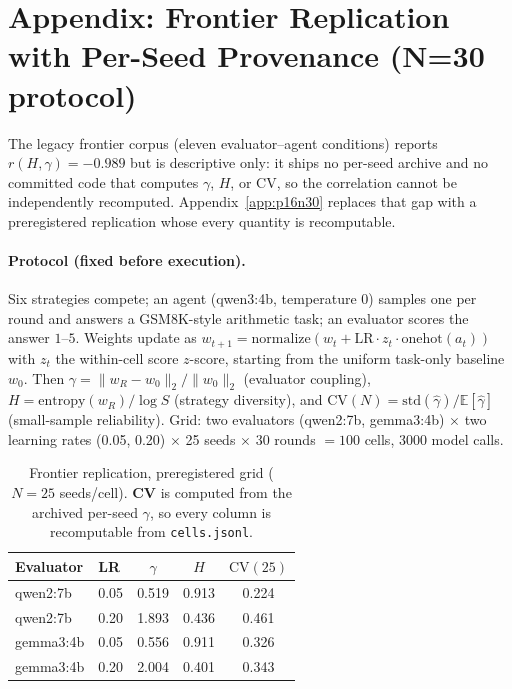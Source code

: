 \documentclass[11pt]{article}
\begin{document}

\section*{Appendix: Frontier Replication with Per-Seed Provenance (N=30 protocol)}
\label{app:p16n30}

The legacy frontier corpus (eleven evaluator--agent conditions) reports
$r(H,\gamma)=-0.989$ but is descriptive only: it ships no per-seed archive and no
committed code that computes $\gamma$, $H$, or $\mathrm{CV}$, so the correlation
cannot be independently recomputed. Appendix~\ref{app:p16n30} replaces that gap
with a preregistered replication whose every quantity is recomputable.

\paragraph{Protocol (fixed before execution).} Six strategies compete; an agent
(qwen3:4b, temperature 0) samples one per round and answers a GSM8K-style
arithmetic task; an evaluator scores the answer $1$--$5$. Weights update as
$w_{t+1}=\mathrm{normalize}\!\left(w_t+\mathrm{LR}\cdot z_t\cdot
\mathrm{onehot}(a_t)\right)$ with $z_t$ the within-cell score $z$-score, starting
from the uniform task-only baseline $w_0$. Then $\gamma=\lVert w_R-w_0\rVert_2/
\lVert w_0\rVert_2$ (evaluator coupling), $H=\mathrm{entropy}(w_R)/\log S$
(strategy diversity), and $\mathrm{CV}(N)=\mathrm{std}(\hat\gamma)/
\mathbb{E}[\hat\gamma]$ (small-sample reliability). Grid: two evaluators
(qwen2:7b, gemma3:4b) $\times$ two learning rates (0.05, 0.20) $\times$ 25 seeds
$\times$ 30 rounds $=100$ cells, 3000 model calls.

\begin{table}[ht]
\centering
\caption{Frontier replication, preregistered grid ($N{=}25$ seeds/cell).
\textbf{CV} is computed from the archived per-seed $\gamma$, so every column is
recomputable from \texttt{cells.jsonl}.}
\label{tab:p16n30}
\begin{tabular}{llccc}
\toprule
Evaluator & LR & $\gamma$ & $H$ & $\mathrm{CV}(25)$ \\
\midrule
qwen2:7b  & 0.05 & 0.519 & 0.913 & 0.224 \\
qwen2:7b  & 0.20 & 1.893 & 0.436 & 0.461 \\
gemma3:4b & 0.05 & 0.556 & 0.911 & 0.326 \\
gemma3:4b & 0.20 & 2.004 & 0.401 & 0.343 \\
\bottomrule
\end{tabular}
\end{table}
\end{document}
